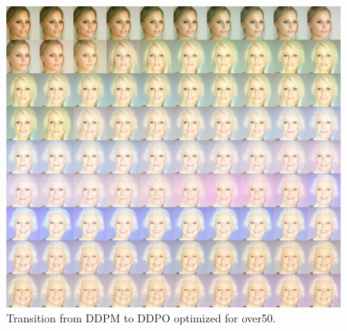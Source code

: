 \begin{appendixs}
        \begin{figure}
            \centering
            \includegraphics[scale=2.80]{img/results/over50_7.png}
            \vspace{-0pt}  %
            \captionsetup{width=\textwidth} %
            \caption{Transition from DDPM to DDPO optimized for over50.}
            \label{fig:ddpm-to-ddpo-over50-extra1}
        \end{figure}


\end{appendixs}
